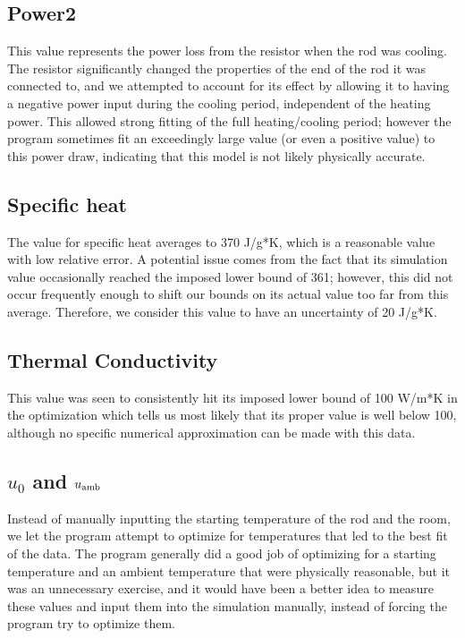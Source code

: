 \documentclass[letterpaper,titlepage,oneside]{report}
\begin{document}
\subsection* {Power2}
This value represents the power loss from the resistor when the rod
was cooling. The resistor significantly changed the properties
of the end of the rod it was connected to, and we attempted to
account for its effect by allowing it to having a negative power
input during the cooling period, independent of the heating power.
This allowed strong fitting of the full heating/cooling period;
however the program sometimes fit an exceedingly large value
(or even a positive value) to this power draw,
indicating that this model is not likely physically accurate.

\subsection* {Specific heat}
The value for specific heat averages to 370 J/g*K,
which is a reasonable value with low relative error.
A potential issue comes from the fact that its simulation value
occasionally reached the imposed lower bound of 361; however,
this did not occur frequently enough to shift our bounds on
its actual value too far from this average.
Therefore, we consider this value to have an uncertainty of 20 J/g*K.

\subsection* {Thermal Conductivity}
This value was seen to consistently hit its imposed lower bound of
100 W/m*K in the optimization which tells us most likely that
its proper value is well below 100, although no specific
numerical approximation can be made with this data.

\subsection* {$u_0$ and $u_{\rm{amb}}$}
Instead of manually inputting the starting temperature of the rod
and the room, we let the program attempt to optimize for temperatures
that led to the best fit of the data. The program generally did a
good job of optimizing for a starting temperature and an ambient
temperature that were physically reasonable, but it was an
unnecessary exercise, and it would have been
a better idea to measure these values and input them into the
simulation manually, instead of forcing the program try to
optimize them.
\end{document}
